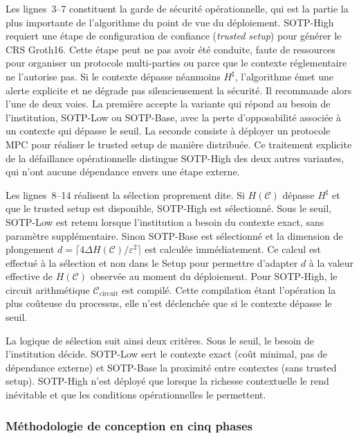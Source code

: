 \begin{sloppypar}
Les lignes~3--7 constituent la garde de s\'ecurit\'e op\'erationnelle, qui
est la partie la plus importante de l'algorithme du point de vue du
d\'eploiement. SOTP-High requiert une \'etape de configuration
de confiance (\emph{trusted setup}) pour g\'en\'erer le CRS Groth16. Cette \'etape peut
ne pas avoir \'et\'e conduite, faute de ressources pour organiser un protocole
multi-parties ou parce que le contexte r\'eglementaire ne l'autorise pas. Si le
contexte d\'epasse n\'eanmoins $H^\sharp$, l'algorithme
\'emet une alerte explicite et ne d\'egrade pas silencieusement la
s\'ecurit\'e. Il recommande alors l'une de deux voies. La premi\`ere accepte la variante qui r\'epond au besoin de l'institution, SOTP-Low ou SOTP-Base,
avec la perte d'opposabilit\'e associ\'ee \`a un contexte qui d\'epasse le seuil. La seconde consiste \`a d\'eployer
un protocole MPC pour r\'ealiser le trusted setup de mani\`ere
distribu\'ee. Ce traitement explicite de la d\'efaillance op\'erationnelle
distingue SOTP-High des deux autres variantes, qui n'ont aucune
d\'ependance envers une \'etape externe.

Les lignes~8--14 r\'ealisent la s\'election proprement dite. Si $H(\mathcal{C})$ d\'epasse
$H^\sharp$ et que le trusted setup est disponible, SOTP-High est s\'electionn\'e. Sous le seuil,
SOTP-Low est retenu lorsque l'institution a besoin du contexte exact, sans param\`etre
suppl\'ementaire. Sinon SOTP-Base est s\'electionn\'e et la dimension de plongement
$d = \lceil 4\Delta H(\mathcal{C})/\varepsilon^2 \rceil$ est calcul\'ee imm\'ediatement. Ce calcul est effectu\'e \`a la s\'election et non dans le \textsf{Setup}
pour permettre d'adapter $d$ \`a la valeur effective de $H(\mathcal{C})$
observ\'ee au moment du d\'eploiement. Pour SOTP-High, le circuit arithm\'etique
$\mathcal{C}_{\text{circuit}}$ est compil\'e. Cette compilation \'etant l'op\'eration la plus co\^uteuse
du processus, elle n'est d\'eclench\'ee que si le contexte d\'epasse le seuil.

La logique de s\'election suit ainsi deux crit\`eres. Sous le seuil, le besoin de l'institution
d\'ecide. SOTP-Low sert le contexte exact (co\^ut
minimal, pas de d\'ependance externe) et SOTP-Base la proximit\'e entre contextes
(sans trusted setup). SOTP-High
n'est d\'eploy\'e que lorsque la richesse contextuelle le rend
in\'evitable et que les conditions op\'erationnelles le permettent.

\subsubsection{M\'ethodologie de conception en cinq phases}
\label{subsubsec:methodologie_cinq_phases_sotp}


\end{sloppypar}
